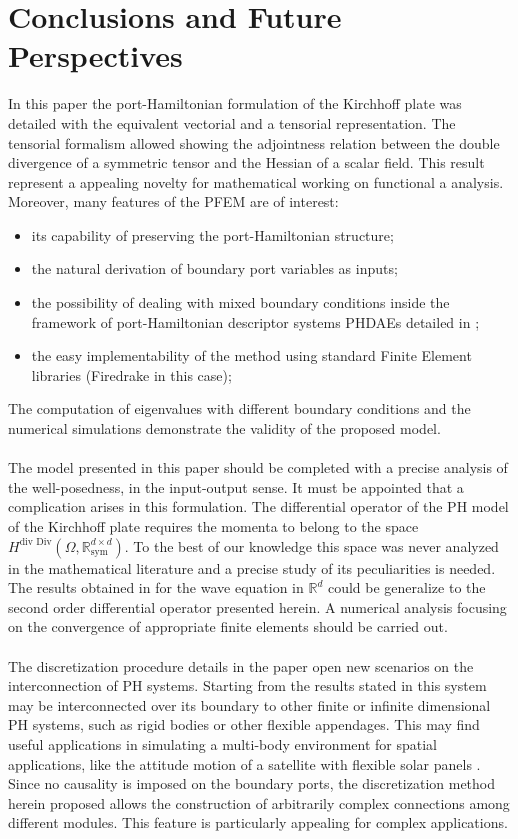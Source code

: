 \documentclass[preprint,12pt]{elsarticle}
\newcommand{\secondReviewer}[1]{\textcolor{blue!80!black}{#1}}
\begin{document}
\section*{Conclusions and Future Perspectives}
\secondReviewer{
In this paper the port-Hamiltonian formulation of the Kirchhoff plate was detailed with the equivalent vectorial and a tensorial representation. The tensorial formalism allowed showing the adjointness relation between the double divergence of a symmetric tensor and the Hessian of a scalar field. This result represent a appealing novelty for mathematical working on functional a analysis. Moreover, many features of the PFEM are of interest:
\begin{itemize}
	\item its capability of preserving the port-Hamiltonian structure;
	\item the natural derivation of boundary port variables as inputs;
	\item the possibility of dealing with mixed boundary conditions inside the framework of  port-Hamiltonian descriptor systems PHDAEs  detailed in \cite{beattie2018linear};
	\item the easy implementability of the method using standard Finite Element libraries (Firedrake \cite{firedrake} in this case);
\end{itemize}   
The computation of eigenvalues with different boundary conditions and the numerical simulations demonstrate the validity of the proposed model. \\ \\
The model presented in this paper should be completed with a precise analysis of the well-posedness, in the input-output sense. It must be appointed that a complication arises in this formulation. The differential operator of the PH model of the Kirchhoff plate requires the momenta to belong to the space $H^{\text{div Div}}(\Omega, \mathbb{R}^{d \times d}_{\text{sym}})$. To the best of our knowledge this space was never analyzed in the mathematical literature and a precise study of its peculiarities is needed. The results obtained in \cite{waveEqZwart} for the wave equation in $\mathbb{R}^d$ could be generalize to the second order differential operator presented herein. A numerical analysis focusing on the convergence of appropriate finite elements should be carried out. \\ \\
The discretization procedure details in the paper open new scenarios on the interconnection of PH systems. Starting from the results stated in \cite{ShaftIntInfinite} this system may be interconnected over its boundary to other finite or infinite dimensional PH systems, such as rigid bodies or other flexible appendages. This may find useful applications in simulating a multi-body environment for spatial applications, like the attitude motion of a satellite with flexible solar panels \cite{aoues:hal-01738092}. Since no causality is imposed on the boundary ports, the discretization method herein proposed allows the construction of arbitrarily complex connections among different modules. This feature is particularly appealing for complex applications.
}
 	
\end{document}
